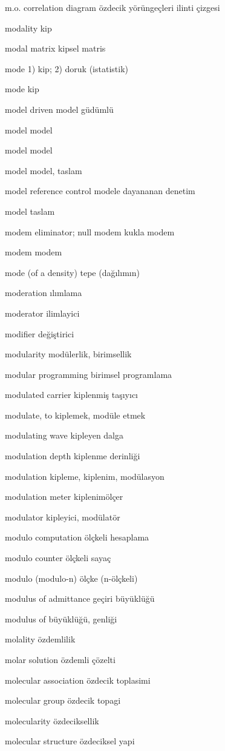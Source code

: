 \documentclass[12pt,fleqn]{article}\usepackage{../../common}
\begin{document}
m.o. correlation diagram özdecik yörüngeçleri ilinti çizgesi

modality kip

modal matrix kipsel matris

mode 1) kip; 2) doruk (istatistik)

mode kip

model driven model güdümlü

model model

model model

model model, taslam

model reference control modele dayananan denetim

model taslam

modem eliminator; null modem kukla modem

modem modem

mode (of a density) tepe (dağılımın)

moderation ılımlama

moderator ilimlayici

modifier değiştirici

modularity modülerlik, birimsellik

modular programming birimsel programlama

modulated carrier kiplenmiş taşıyıcı

modulate, to kiplemek, modüle etmek

modulating wave kipleyen dalga

modulation depth kiplenme derinliği

modulation kipleme, kiplenim, modülasyon

modulation meter kiplenimölçer

modulator kipleyici, modülatör

modulo computation ölçkeli hesaplama

modulo counter ölçkeli sayaç

modulo (modulo-n) ölçke (n-ölçkeli)

modulus of admittance geçiri büyüklüğü

modulus of büyüklüğü, genliği

molality özdemlilik

molar solution özdemli çözelti

molecular association özdecik toplasimi

molecular group özdecik topagi

molecularity özdeciksellik

molecular structure özdeciksel yapi
\end{document}
